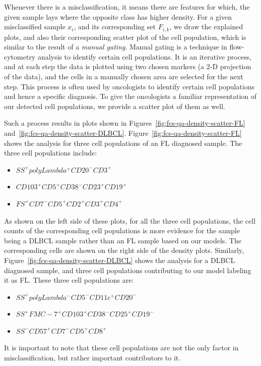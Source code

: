 Whenever there is a misclassification, it means there are features for which, the given sample lays where the opposite class has higher density. For a given misclassified sample $x_i$, and its corresponding set $F_{i,k}$, we draw the explained plots, and also their corresponding scatter plot of the cell population, which is similar to the result of a \emph{manual gating}. Manual gating is a technique in flow-cytometry analysis to identify certain cell populations. It is an iterative process, and at each step the data is plotted using two chosen markers (a 2-D projection of the data), and the cells in a manually chosen area are selected for the next step. This process is often used by oncologists to identify certain cell populations and hence a specific diagnosis. To give the oncologists a familiar representation of our detected cell populations, we provide a scatter plot of them as well.

Such a process results in plots shown in Figures~\ref{fig:fcs-qa-density-scatter-FL} and~\ref{fig:fcs-qa-density-scatter-DLBCL}. Figure~\ref{fig:fcs-qa-density-scatter-FL} shows the analysis for three cell populations of an FL diagnosed sample. The three cell populations include: 
\begin{itemize}
\item $SS^+ polyLambda^+ CD20^- CD3^+$ 
\item $CD103^+ CD5^+ CD38^- CD23^+ CD19^+$
\item $FS^+ CD7^- CD5^+ CD2^+ CD3^+ CD4^+$
\end{itemize}

As shown on the left side of these plots, for all the three cell populations, the cell counts of the corresponding cell populations is more evidence for the sample being a DLBCL sample rather than an FL sample based on our models. The corresponding cells are shown on the right side of the density plots. Similarly, Figure~\ref{fig:fcs-qa-density-scatter-DLBCL} shows the analysis for a DLBCL diagnosed sample, and three cell populations contributing to our model labeling it as FL. These three cell populations are: 
\begin{itemize}
\item $SS^+ polyLambda^- CD5^- CD11c^+ CD20^-$
\item $SS^+ FMC-7^+ CD103^+ CD38^- CD25^+ CD19^-$
\item $SS^- CD57^+ CD7^- CD5^+ CD8^+$
\end{itemize}

It is important to note that these cell populations are not the only factor in misclassification, but rather important contributors to it.

